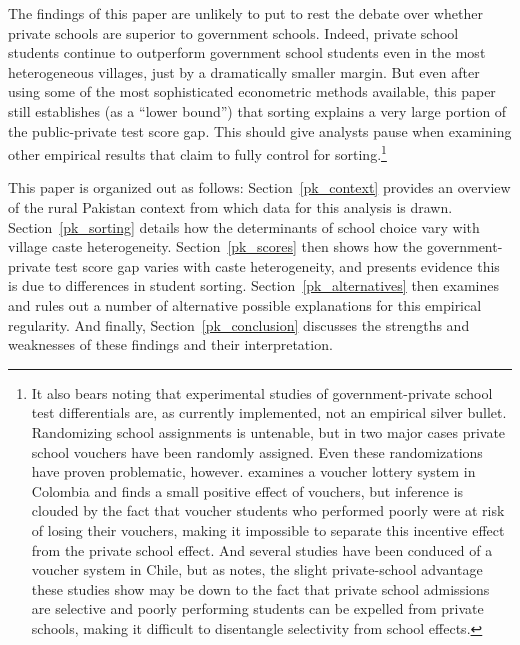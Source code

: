 \documentclass[Eubank_pk_ethnic_sorting.tex]{subfiles}
\begin{document}
The findings of this paper are unlikely to put to rest the debate over whether private schools are superior to government schools. Indeed, private school students continue to outperform government school students even in the most heterogeneous villages, just by a dramatically smaller margin. But even after using some of the most sophisticated econometric methods available, this paper still establishes (as a  ``lower bound'') that sorting explains a very large portion of the public-private test score gap. This should give analysts pause when examining other empirical results that claim to fully control for sorting.\footnote{It also bears noting that experimental studies of government-private school test differentials are, as currently implemented, not an empirical silver bullet. Randomizing school assignments is untenable, but in two major cases private school vouchers have been randomly assigned. Even these randomizations have proven problematic, however. \cite{Angrist:2002up} examines a voucher lottery system in Colombia and finds a small positive effect of vouchers, but inference is clouded by the fact that voucher students who performed poorly were at risk of losing their vouchers, making it impossible to separate this incentive effect from the private school effect. And several studies have been conduced of a voucher system in Chile, but as \cite{Bellei:2008uu} notes, the slight private-school advantage these studies show may be down to the fact that private school admissions are selective and poorly performing students can be expelled from private schools, making it difficult to disentangle selectivity from school effects.}

This paper is organized out as follows: Section~\ref{pk_context} provides an overview of the rural Pakistan context from which data for this analysis is drawn. Section~\ref{pk_sorting} details how the determinants of school choice vary with village caste heterogeneity. Section~\ref{pk_scores} then shows how the government-private test score gap varies with caste heterogeneity, and presents evidence this is due to differences in student sorting. Section~\ref{pk_alternatives} then examines and rules out a number of alternative possible explanations for this empirical regularity. And finally, Section~\ref{pk_conclusion} discusses the strengths and weaknesses of these findings and their interpretation. 
\end{document}
